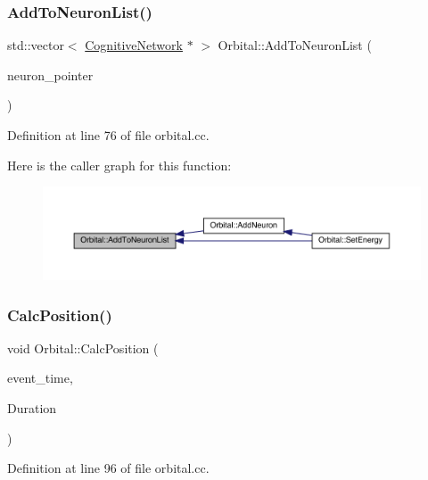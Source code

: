 \subsubsection{\texorpdfstring{Add\+To\+Neuron\+List()}{AddToNeuronList()}}
{\footnotesize\ttfamily std\+::vector$<$ \hyperlink{class_cognitive_network}{Cognitive\+Network} $\ast$ $>$ Orbital\+::\+Add\+To\+Neuron\+List (\begin{DoxyParamCaption}\item[{\hyperlink{class_cognitive_network}{Cognitive\+Network} $\ast$}]{neuron\+\_\+pointer }\end{DoxyParamCaption})}



Definition at line 76 of file orbital.\+cc.

Here is the caller graph for this function\+:
\nopagebreak
\begin{figure}[H]
\begin{center}
\leavevmode
\includegraphics[width=350pt]{class_orbital_a44230cebc40357d186c442bfac2507a4_icgraph}
\end{center}
\end{figure}
\mbox{\label{class_orbital_a5aa5edbae517ff393fc1eb0ae2422123}} 
\subsubsection{\texorpdfstring{Calc\+Position()}{CalcPosition()}}
{\footnotesize\ttfamily void Orbital\+::\+Calc\+Position (\begin{DoxyParamCaption}\item[{std\+::chrono\+::time\+\_\+point$<$ \hyperlink{universe_8h_a0ef8d951d1ca5ab3cfaf7ab4c7a6fd80}{Clock} $>$}]{event\+\_\+time,  }\item[{double}]{Duration }\end{DoxyParamCaption})}



Definition at line 96 of file orbital.\+cc.


